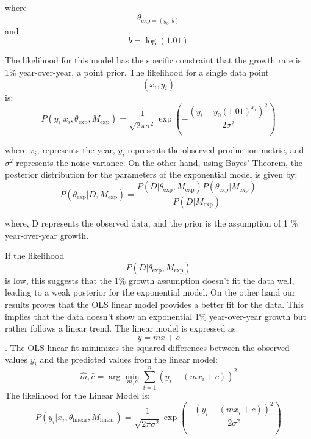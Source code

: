 \documentclass[final,5p,times,twocolumn,authoryear]{elsarticle}
\begin{document}
where $$\theta_{\text{exp}= (y_0,b)}$$ and $$ b= \log(1.01)$$

The likelihood for this model has the specific constraint that the growth rate is 1\% year-over-year, a point prior. The likelihood for a single data point $$(x_{i},y_{i})$$ is: $$P(y_i | x_i, \theta_{\text{exp}}, M_{\text{exp}}) = \frac{1}{\sqrt{2 \pi \sigma^2}} \exp \left( -\frac{(y_i - y_0 (1.01)^{x_i})^2}{2\sigma^2} \right)
$$

where $x_{i}$, represents the year, $y_{i}$ represents the observed production metric, and $\sigma^{2}$ represents the noise variance. On the other hand, using Bayes' Theorem, the posterior distribution for the parameters of the exponential model is given by:
$$P(\theta_{\text{exp}} | D, M_{\text{exp}}) = \frac{P(D | \theta_{\text{exp}}, M_{\text{exp}}) P(\theta_{\text{exp}} | M_{\text{exp}})}{P(D | M_{\text{exp}})}
$$

where, D represents the observed data, and the prior is the assumption of 1 \% year-over-year growth. 

If the likelihood $$ P(D | \theta_{\text{exp}}, M_{\text{exp}})$$ is low, this suggests that the 1\% growth assumption doesn't fit the data well, leading to a weak posterior for the exponential model.
 On the other hand our results proves that the OLS linear model provides a better fit for the data. This implies that the data doesn't show an exponential 1\% year-over-year growth but rather follows a linear trend. The linear model is expressed as: $$y=mx+c$$. The OLS linear fit minimizes the squared differences between the observed values $y_{i}$ and the predicted values from the linear model: $$\hat{m}, \hat{c} = \arg\min_{m, c} \sum_{i=1}^{n} (y_i - (mx_i + c))^2
$$
The likelihood for the Linear Model is:
$$P(y_i | x_i, \theta_{\text{linear}}, M_{\text{linear}}) = \frac{1}{\sqrt{2 \pi \sigma^2}} \exp \left( -\frac{(y_i - (mx_i + c))^2}{2\sigma^2} \right)
$$
\end{document}
